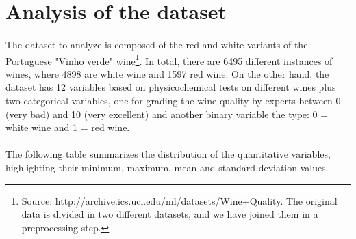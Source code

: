 \documentclass[10pt]{article}
\begin{document}




\tableofcontents

\newpage
{}

\section{Analysis of the dataset}

\paragraph*{}
The dataset to analyze is composed of the red and white variants of the Portuguese "Vinho verde" wine\footnote{Source: http://archive.ics.uci.edu/ml/datasets/Wine+Quality. The original data is divided in two different datasets, and we have joined them in a preprocessing step.}. In total, there are 6495 different instances of wines, where 4898 are white wine and 1597 red wine. On the other hand, the dataset has 12 variables based on physicochemical tests on different wines plus two categorical variables, one for grading the wine quality by experts between 0 (very bad) and 10 (very excellent) and another binary  variable the type: 0 = white wine and 1 = red wine.

\paragraph*{}
The following table summarizes the distribution of the quantitative variables, highlighting their minimum, maximum, mean and standard deviation values. 
\end{document}

